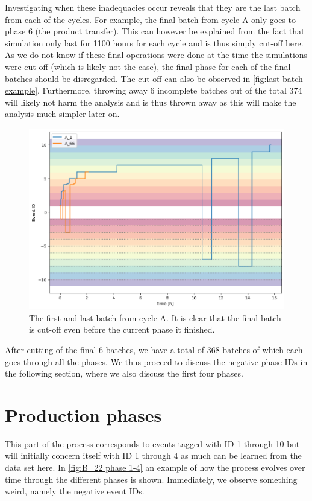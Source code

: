 \documentclass[../Thesis.tex]{subfiles}
\begin{document}
Investigating when these inadequacies occur reveals that they are the last batch from each of the cycles. For example, the final batch from cycle A only goes to phase 6 (the product transfer). This can however be explained from the fact that simulation only last for 1100 hours for each cycle and is thus simply cut-off here. As we do not know if these final operations were done at the time the simulations were cut off (which is likely not the case), the final phase for each of the final batches should be disregarded. The cut-off can also be observed in \autoref{fig:last batch example}. Furthermore, throwing away 6 incomplete batches out of the total 374 will likely not harm the analysis and is thus thrown away as this will make the analysis much simpler later on.

\begin{figure}[h]
    \centering
    \includegraphics[width=0.8\linewidth]{figures/Multiple cycles data/tailing batch short.png}
    \caption{The first and last batch from cycle A. It is clear that the final batch is cut-off even before the current phase it finished.}
    \label{fig:last batch example}
\end{figure}

After cutting of the final 6 batches, we have a total of 368 batches of which each goes through all the phases. We thus proceed to discuss the negative phase IDs in the following section, where we also discuss the first four phases.




\newpage

\section{Production phases}
This part of the process corresponds to events tagged with ID 1 through 10 but will initially concern itself with ID 1 through 4 as much can be learned from the data set here. In \autoref{fig:B_22 phase 1-4} an example of how the process evolves over time through the different phases is shown. Immediately, we observe something weird, namely the negative event IDs.
\end{document}
